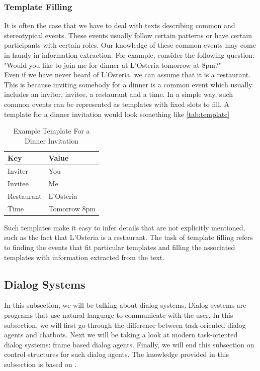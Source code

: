 \subsubsection{Template Filling}
It is often the case that we have to deal with texts describing common and stereotypical events.
These events usually follow certain patterns or have certain participants with certain roles.
Our knowledge of these common events may come in handy in information extraction.
For example, consider the following question:\\
"Would you like to join me for dinner at L'Osteria tomorrow at 8pm?"\\
Even if we have never heard of L'Osteria, we can assume that it is a restaurant.
This is because inviting somebody for a dinner is a common event which usually includes an inviter, invitee, a restaurant and a time.
In a simple way, such common events can be represented as templates with fixed slots to fill.
A template for a dinner invitation would look something like \autoref{tab:template}

\begin{table}[htbp]
  \caption[Example Template For a Dinner Invitation]{Example Template For a Dinner Invitation}\label{tab:template}
  \centering
  \begin{tabular}{l|l}
    Key&Value\\ \toprule
    Inviter&You\\ \hline
    Invitee&Me\\ \hline
    Restaurant&L'Osteria\\ \hline
    Time&Tomorrow 8pm\\ \hline
  \end{tabular}
\end{table}

Such templates make it easy to infer details that are not explicitly mentioned, such as the fact that L'Osteria is a restaurant.
The task of template filling refers to finding the events that fit particular templates 
and filling the associated templates with information extracted from the text.\

\subsection{Dialog Systems}
In this subsection, we will be talking about dialog systems.
Dialog systems are programs that use natural language to communicate with the user.
In this subsection, we will first go through the difference between task-oriented dialog agents and chatbots.
Next we will be taking a look at modern task-oriented dialog systems: frame based dialog agents.
Finally, we will end this subsection on control structures for such dialog agents.
The knowledge provided in this subsection is based on \parencite{nlp_chatbots}.

